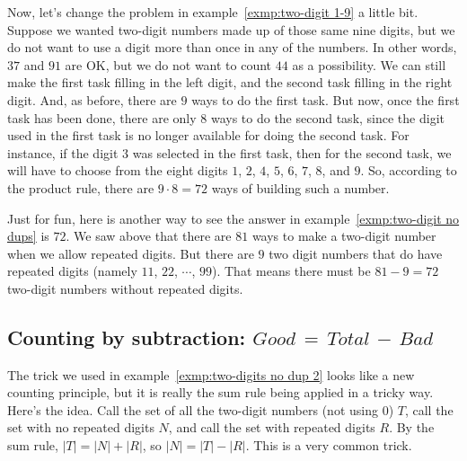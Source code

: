 \begin{exmp}\label{exmp:two-digit no dups}
 Now, let's
 change the problem in example~\ref{exmp:two-digit 1-9} a little bit. 
 Suppose we wanted two-digit numbers made up of
 those same nine digits, but we do not want to use a digit more than once in any of
 the numbers. In other words, $37$ and $91$ are OK, but we do not want to count
 $44$ as a possibility. We can still make the first task filling in the left digit,
 and the second task filling in the 
 right digit. And, as before, there are $9$ ways to do the first task. But now,
 once the first task has been done, there are only $8$ ways to do the second task,
 since the digit used in the first task is no longer available for doing the
 second task. For instance, if the digit $3$ was selected in the first task,
 then for the second task, we will have to choose from the eight digits $1$, $2$,
 $4$, $5$, $6$, 
 $7$, $8$, and $9$. So, according to the product rule, there are $9\cdot8=72$ ways
 of building such a number. 
\end{exmp}


\begin{exmp}\label{exmp:two-digits no dup 2}
 Just for fun, here is another way to see the answer in example~\ref{exmp:two-digit no dups} is
 $72$. We saw above that there are $81$ ways to make a two-digit number when we
 allow repeated digits. But there are $9$ two digit numbers that do have
 repeated digits (namely $11$, $22$, $\cdots$, $99$). That means there must be
 $81-9 =72$  two-digit numbers without repeated digits.
\end{exmp}

\subsection{Counting by subtraction: $Good \,=\, Total\,-\,Bad$}
The trick we used in example~\ref{exmp:two-digits no dup 2}  looks like a new counting principle, but it is really the sum rule being
applied in a tricky way. Here's the idea. Call the set of all the two-digit numbers
(not using $0$) $T$, call the set with no repeated digits $N$, and call the set
with repeated digits $R$. By the sum rule, $|T|=|N|+|R|$, so $|N| = |T|-|R|$.
This is a very common trick. 

